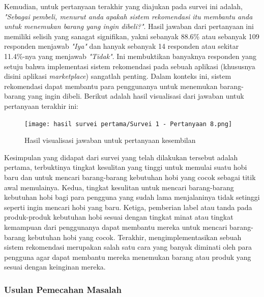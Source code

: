 \documentclass[a4paper]{article}
\newcommand{\subsubbab}[1]{%
    \subsubsection{#1}%
}
\begin{document}
Kemudian, untuk pertanyaan terakhir yang diajukan pada survei ini adalah, \textit{"Sebagai pembeli, menurut anda apakah sistem rekomendasi itu membantu anda untuk menemukan barang yang ingin dibeli?"}. Hasil jawaban dari pertanyaan ini memiliki selisih yang sanagat signifikan, yakni sebanyak 88.6\% atau sebanyak 109 responden menjawab \textit{"Iya"} dan hanyak sebanyak 14 responden atau sekitar 11.4\%-nya yang menjawab \textit{"Tidak"}. Ini membuktikan banyaknya responden yang setuju bahwa implementasi sistem rekomendasi pada sebuah aplikasi (khususnya disini aplikasi \textit{marketplace}) sangatlah penting. Dalam konteks ini, sistem rekomendasi dapat membantu para penggunanya untuk menemukan barang-barang yang ingin dibeli. Berikut adalah hasil visualisasi dari jawaban untuk pertanyaan terakhir ini:

\begin{figure}[h]
    \centering
    \texttt{[image: hasil survei pertama/Survei 1 - Pertanyaan 8.png]}
    \caption{Hasil visualisasi jawaban untuk pertanyaan kesembilan}
\end{figure}
\newpage
Kesimpulan yang didapat dari survei yang telah dilakukan tersebut adalah pertama, terbuktinya tingkat kesulitan yang tinggi untuk memulai suatu hobi baru dan untuk mencari barang-barang kebutuhan hobi yang cocok sebagai titik awal memulainya. Kedua, tingkat kesulitan untuk mencari barang-barang kebutuhan hobi bagi para pengguna yang sudah lama menjalaninya tidak setinggi seperti ingin mencari hobi yang baru. Ketiga, pemberian label atau tanda pada produk-produk kebutuhan hobi sesuai dengan tingkat minat atau tingkat kemampuan dari penggunanya dapat membantu mereka untuk mencari barang-barang kebutuhan hobi yang cocok. Terakhir, mengimplementasikan sebuah sistem rekomendasi merupakan salah satu cara yang banyak diminati oleh para pengguna agar dapat membantu mereka menemukan barang atau produk yang sesuai dengan keinginan mereka.

\subsubbab{Usulan Pemecahan Masalah}
\end{document}
